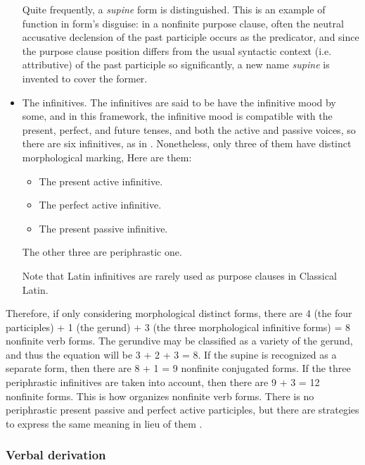\documentclass{article}
\newcommand*{\citesec}[1]{\S~{#1}}
\newcommand*{\term}[1]{\emph{#1}}
\begin{document}
\begin{itemize}
    Quite frequently, a \term{supine} form is distinguished.
    This is an example of function in form's disguise: 
    in a nonfinite purpose clause,
    often the neutral accusative declension of the past participle occurs as the predicator,
    and since the purpose clause position differs 
    from the usual syntactic context (i.e. attributive) of the past participle
    so significantly,
    a new name \term{supine} is invented to cover the former.
    \item The infinitives. The infinitives are said to be have the infinitive mood by some,
    and in this framework, the infinitive mood is compatible with the 
    present, perfect, and future tenses,
    and both the active and passive voices,
    so there are six infinitives, as in .
    Nonetheless, only three of them have distinct morphological marking, 
    Here are them:
    \begin{itemize}
        \item The present active infinitive.
        \item The perfect active infinitive.
        \item The present passive infinitive.
    \end{itemize}
    The other three are periphrastic one.

    Note that Latin infinitives are rarely used as purpose clauses in Classical Latin.
\end{itemize} 

Therefore, if only considering morphological distinct forms,
there are 4 (the four participles) + 1 (the gerund) + 3 (the three morphological infinitive forms) = 8
nonfinite verb forms.
The gerundive may be classified as a variety of the gerund, 
and thus the equation will be 3 + 2 + 3 = 8.
If the supine is recognized as a separate form,
then there are 8 + 1 = 9 nonfinite conjugated forms.
If the three periphrastic infinitives are taken into account,
then there are 9 + 3 = 12 nonfinite forms.
This is how \citet{allen1903allen} organizes nonfinite verb forms.
There is no periphrastic present passive and perfect active participles,
but there are strategies to express the same meaning 
in lieu of them \citep[\citesec{491-493}]{allen1903allen}.

\subsubsection{Verbal derivation}\label{sec:verb-derivation-abs}
\end{document}

